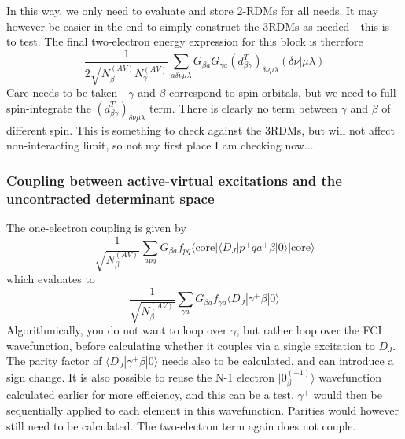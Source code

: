 \documentclass[a4paper,oneside,11pt]{article}
\numberwithin{equation}{section}
\newcommand{\DMETKet}{|0\rangle| \mathrm{core} \rangle}
\begin{document}
In this way, we only need to evaluate and store 2-RDMs for all needs. It may however be easier in the end to simply construct the 3RDMs as needed - this is to test.
The final two-electron energy expression for this block is therefore
\begin{equation}
\frac{1}{2 \sqrt{N^{(AV)}_{\beta}N^{(AV)}_{\gamma}}} \sum_{a \delta \nu \mu \lambda} G_{\beta a} G_{\gamma a} (d^T_{\beta \gamma})_{\delta \nu \mu \lambda} (\delta \nu | \mu \lambda)   \label{DiagAVBlock2e}
\end{equation}
Care needs to be taken - $\gamma$ and $\beta$ correspond to spin-orbitals, but we need to full spin-integrate the $(d^T_{\beta \gamma})_{\delta \nu \mu \lambda}$ term. There is clearly no term
between $\gamma$ and $\beta$ of different spin. This is something to check against
the 3RDMs, but will not affect non-interacting limit, so not my first place I am checking now...

\subsubsection{Coupling between active-virtual excitations and the uncontracted determinant space}
The one-electron coupling is given by
\begin{equation}
\frac{1}{\sqrt{N_{\beta}^{(AV)}}} \sum_{apq} G_{\beta a} f_{pq} \langle \textrm{core} | \langle D_J | p^{+} q a^{+} \beta \DMETKet
\end{equation}
which evaluates to
\begin{equation}
\frac{1}{\sqrt{N_{\beta}^{(AV)}}} \sum_{\gamma a} G_{\beta a} f_{\gamma a} \langle D_J | \gamma^{+} \beta | 0 \rangle
\end{equation}
Algorithmically, you do not want to loop over $\gamma$, but rather loop over the FCI wavefunction, before calculating whether it couples via a single excitation to $D_J$. The parity factor of 
$\langle D_J | \gamma^{+} \beta | 0 \rangle$ needs also to be calculated, and can introduce a sign change. It is also possible to reuse the N-1 electron $|0^{(-1)}_{\beta} \rangle$ wavefunction calculated
earlier for more efficiency, and this can be a test. $\gamma^{+}$ would then be sequentially applied to each element in this wavefunction. Parities would however still need to be calculated.
The two-electron term again does not couple.
\end{document}
